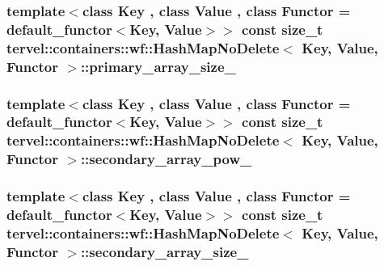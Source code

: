 \subsubsection[{primary\+\_\+array\+\_\+size\+\_\+}]{\setlength{\rightskip}{0pt plus 5cm}template$<$class Key , class Value , class Functor  = default\+\_\+functor$<$\+Key, Value$>$$>$ const size\+\_\+t {\bf tervel\+::containers\+::wf\+::\+Hash\+Map\+No\+Delete}$<$ Key, {\bf Value}, Functor $>$\+::primary\+\_\+array\+\_\+size\+\_\+\hspace{0.3cm}{\ttfamily [private]}}\label{classtervel_1_1containers_1_1wf_1_1_hash_map_no_delete_a1f333a92710074bed29c9f941b06eec7}
\hypertarget{classtervel_1_1containers_1_1wf_1_1_hash_map_no_delete_a0c80efcf817e89cd28b70549611afdbe}{}
\subsubsection[{secondary\+\_\+array\+\_\+pow\+\_\+}]{\setlength{\rightskip}{0pt plus 5cm}template$<$class Key , class Value , class Functor  = default\+\_\+functor$<$\+Key, Value$>$$>$ const size\+\_\+t {\bf tervel\+::containers\+::wf\+::\+Hash\+Map\+No\+Delete}$<$ Key, {\bf Value}, Functor $>$\+::secondary\+\_\+array\+\_\+pow\+\_\+\hspace{0.3cm}{\ttfamily [private]}}\label{classtervel_1_1containers_1_1wf_1_1_hash_map_no_delete_a0c80efcf817e89cd28b70549611afdbe}
\hypertarget{classtervel_1_1containers_1_1wf_1_1_hash_map_no_delete_ab729cf227a5662c6f91b4ead2e8ca7f7}{}
\subsubsection[{secondary\+\_\+array\+\_\+size\+\_\+}]{\setlength{\rightskip}{0pt plus 5cm}template$<$class Key , class Value , class Functor  = default\+\_\+functor$<$\+Key, Value$>$$>$ const size\+\_\+t {\bf tervel\+::containers\+::wf\+::\+Hash\+Map\+No\+Delete}$<$ Key, {\bf Value}, Functor $>$\+::secondary\+\_\+array\+\_\+size\+\_\+\hspace{0.3cm}{\ttfamily [private]}}\label{classtervel_1_1containers_1_1wf_1_1_hash_map_no_delete_ab729cf227a5662c6f91b4ead2e8ca7f7}
\hypertarget{classtervel_1_1containers_1_1wf_1_1_hash_map_no_delete_a48a1191506c1beadd156e234e037126a}{}
